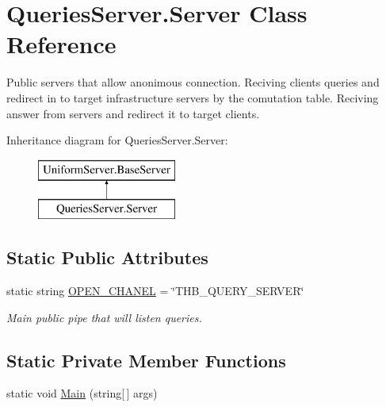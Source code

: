 \hypertarget{class_queries_server_1_1_server}{}\section{Queries\+Server.\+Server Class Reference}
\label{class_queries_server_1_1_server}


Public servers that allow anonimous connection. Reciving clients\textquotesingle{} queries and redirect in to target infrastructure servers by the comutation table. Reciving answer from servers and redirect it to target clients.  


Inheritance diagram for Queries\+Server.\+Server\+:\begin{figure}[H]
\begin{center}
\leavevmode
\includegraphics[height=2.000000cm]{d2/d9a/class_queries_server_1_1_server}
\end{center}
\end{figure}
\subsection*{Static Public Attributes}
\begin{DoxyCompactItemize}
\item 
static string \mbox{\hyperlink{class_queries_server_1_1_server_a5d7c4c9ababa7292ef7cac92005d3563}{O\+P\+E\+N\+\_\+\+C\+H\+A\+N\+EL}} = \char`\"{}T\+H\+B\+\_\+\+Q\+U\+E\+R\+Y\+\_\+\+S\+E\+R\+V\+ER\char`\"{}
\begin{DoxyCompactList}\small\item\em Main public pipe that will listen queries. \end{DoxyCompactList}\end{DoxyCompactItemize}
\subsection*{Static Private Member Functions}
\begin{DoxyCompactItemize}
\item 
static void \mbox{\hyperlink{class_queries_server_1_1_server_ae294b75511557ef0701455c0e2ba785d}{Main}} (string\mbox{[}$\,$\mbox{]} args)
\end{DoxyCompactItemize}
